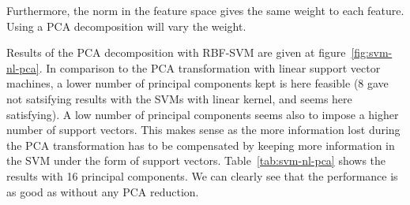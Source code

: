 Furthermore, the norm in the feature space gives the same weight to each feature. Using a PCA decomposition will vary the weight.  

Results of the PCA decomposition with RBF-SVM are given at figure~\ref{fig:svm-nl-pca}. In comparison to the PCA transformation with linear support vector machines, a lower number of principal components kept is here feasible (8 gave not satsifying results with the SVMs with linear kernel, and seems here satisfying). A low number of principal components seems also to impose a higher number of support vectors. This makes sense as the more information lost during the PCA transformation has to be compensated by keeping more information in the SVM under the form of support vectors. Table~\ref{tab:svm-nl-pca} shows the results with 16 principal components. We can clearly see that the performance is as good as without any PCA reduction.

